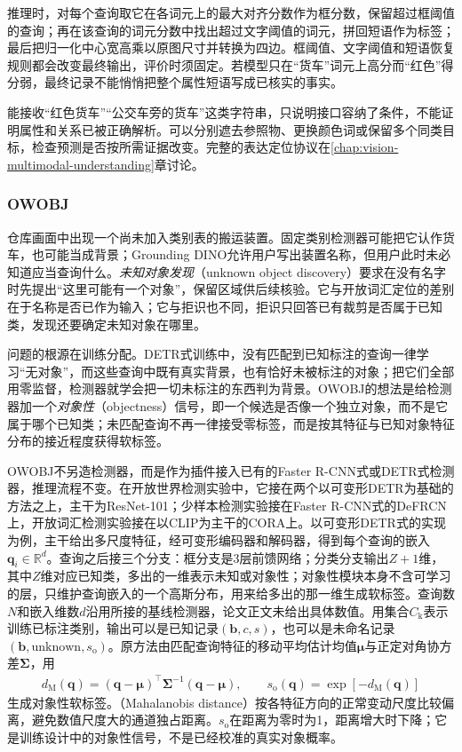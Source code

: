 推理时，对每个查询取它在各词元上的最大对齐分数作为框分数，保留超过框阈值的查询；再在该查询的词元分数中找出超过文字阈值的词元，拼回短语作为标签；最后把归一化中心宽高乘以原图尺寸并转换为四边。框阈值、文字阈值和短语恢复规则都会改变最终输出，评价时须固定。若模型只在“货车”词元上高分而“红色”得分弱，最终记录不能悄悄把整个属性短语写成已核实的事实。

能接收“红色货车”“公交车旁的货车”这类字符串，只说明接口容纳了条件，不能证明属性和关系已被正确解析。可以分别遮去参照物、更换颜色词或保留多个同类目标，检查预测是否按所需证据改变。完整的表达定位协议在\ref{chap:vision-multimodal-understanding}章讨论。

\subsubsection{OWOBJ}
\label{sec:vision-recognition-unknown-discovery}
\label{sec:vision-recognition-owobj}

仓库画面中出现一个尚未加入类别表的搬运装置。固定类别检测器可能把它认作货车，也可能当成背景；Grounding DINO允许用户写出装置名称，但用户此时未必知道应当查询什么。\emph{未知对象发现}（unknown object discovery）要求在没有名字时先提出“这里可能有一个对象”，保留区域供后续核验。它与开放词汇定位的差别在于名称是否已作为输入；它与拒识也不同，拒识只回答已有裁剪是否属于已知类，发现还要确定未知对象在哪里。

问题的根源在训练分配。DETR式训练中，没有匹配到已知标注的查询一律学习“无对象”，而这些查询中既有真实背景，也有恰好未被标注的对象；把它们全部用零监督，检测器就学会把一切未标注的东西判为背景。OWOBJ的想法是给检测器加一个\emph{对象性}（objectness）信号，即一个候选是否像一个独立对象，而不是它属于哪个已知类；未匹配查询不再一律接受零标签，而是按其特征与已知对象特征分布的接近程度获得软标签。

OWOBJ不另造检测器，而是作为插件接入已有的Faster R-CNN式或DETR式检测器，推理流程不变。在开放世界检测实验中，它接在两个以可变形DETR为基础的方法之上，主干为ResNet-101；少样本检测实验接在Faster R-CNN式的DeFRCN上，开放词汇检测实验接在以CLIP为主干的CORA上。以可变形DETR式的实现为例，主干给出多尺度特征，经可变形编码器和解码器，得到每个查询的嵌入$\bm{q}_i\in\mathbb{R}^d$。查询之后接三个分支：框分支是3层前馈网络；分类分支输出$Z+1$维，其中$Z$维对应已知类，多出的一维表示未知或对象性；对象性模块本身不含可学习的层，只维护查询嵌入的一个高斯分布，用来给多出的那一维生成软标签。查询数$N$和嵌入维数$d$沿用所接的基线检测器，论文正文未给出具体数值。用集合$C_{\mathrm{k}}$表示训练已标注类别，输出可以是已知记录$(\bm{b},c,s)$，也可以是未命名记录$(\bm{b},\mathrm{unknown},s_{\mathrm{o}})$。原方法由匹配查询特征的移动平均估计均值$\bm{\mu}$与正定对角协方差$\bm{\Sigma}$，用
\begin{equation}
 \begin{aligned}
 d_{\mathrm{M}}(\bm{q})=
 (\bm{q}-\bm{\mu})^\top\bm{\Sigma}^{-1}(\bm{q}-\bm{\mu}),\qquad
 s_{\mathrm{o}}(\bm{q})=\exp[-d_{\mathrm{M}}(\bm{q})]
 \end{aligned}
 \label{eq:vision-owobj-objectness}
\end{equation}
生成对象性软标签。（Mahalanobis distance）按各特征方向的正常变动尺度比较偏离，避免数值尺度大的通道独占距离。$s_{\mathrm{o}}$在距离为零时为1，距离增大时下降；它是训练设计中的对象性信号，不是已经校准的真实对象概率。

